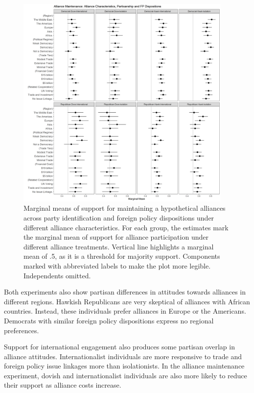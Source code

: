 \documentclass[12pt]{article}
\begin{document}
\begin{figure}
	\centering
		\includegraphics[width=0.95\textwidth]{../figures/party-dispo-main-char.png}
	\caption{Marginal means of support for maintaining a hypothetical alliances across party identification and foreign policy dispositions under different alliance characteristics. For each group, the estimates mark the marginal mean of support for alliance participation under different alliance treatments. Vertical line highlights a marginal mean of .5, as it is a threshold for majority support. Components marked with abbreviated labels to make the plot more legible. Independents omitted.}
	\label{fig:party-dispo-main-char}
\end{figure}



Both experiments also show partisan differences in attitudes towards alliances in different regions. 
Hawkish Republicans are very skeptical of alliances with African countries. 
Instead, these individuals prefer alliances in Europe or the Americans. 
Democrats with similar foreign policy dispositions express no regional preferences. 


Support for international engagement also produces some partisan overlap in alliance attitudes. 
Internationalist individuals are more responsive to trade and foreign policy issue linkages more than isolationists. 
In the alliance maintenance experiment, dovish and internationalist individuals are also more likely to reduce their support as alliance costs increase. 
\end{document}
